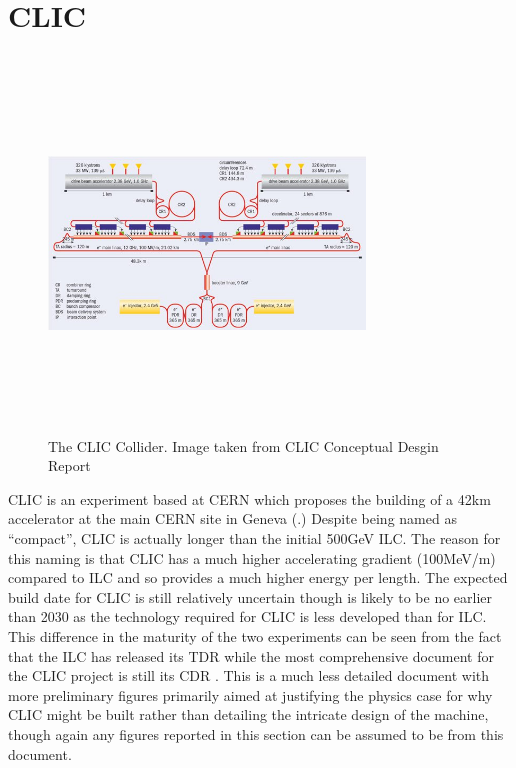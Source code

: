 \section{CLIC}
\begin{figure}
  \centering
  \includegraphics[width=0.75\textwidth,height=10cm,keepaspectratio]{fig/clic}
  \caption[The CLIC Experiment]{The CLIC Collider. Image taken from CLIC Conceptual Desgin Report\cite{CDR}}
  \label{Fig:CLIC}
\end{figure}
\ac{CLIC} is an experiment based at CERN which proposes the building of a 42km accelerator at the main CERN site in Geneva (.) Despite being named as “compact”, \ac{CLIC} is actually longer than the initial 500GeV \ac{ILC}. The reason for this naming is that \ac{CLIC} has a much higher accelerating gradient (100MeV/m) compared to ILC and so provides a much higher energy per length. The expected build date for \ac{CLIC} is still relatively uncertain though is likely to be no earlier than 2030 as the technology required for \ac{CLIC} is less developed than for \ac{ILC}. This difference in the maturity of the two experiments can be seen from the fact that the \ac{ILC} has released its \ac{TDR} while the most comprehensive document for the CLIC project is still its \ac{CDR} \cite{CDR}.  This is a much less detailed document with more preliminary figures primarily aimed at justifying the physics case for why \ac{CLIC} might be built rather than detailing the intricate design of the machine, though again any figures reported in this section can be assumed to be from this document. 

